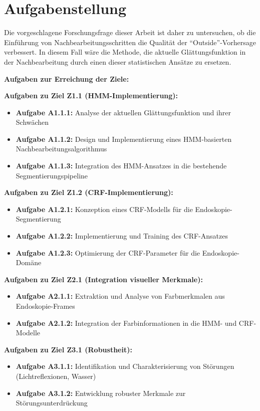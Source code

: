\section{Aufgabenstellung}

Die vorgeschlagene Forschungsfrage dieser Arbeit ist daher zu untersuchen, ob die Einführung von Nachbearbeitungsschritten die Qualität der \enquote{Outside}-Vorhersage verbessert. In diesem Fall wäre die Methode, die aktuelle Glättungsfunktion in der Nachbearbeitung durch einen dieser statistischen Ansätze zu ersetzen.

\textbf{Aufgaben zur Erreichung der Ziele:}

\textbf{Aufgaben zu Ziel Z1.1 (HMM-Implementierung):}
\begin{itemize}
\item \textbf{Aufgabe A1.1.1:} Analyse der aktuellen Glättungsfunktion und ihrer Schwächen
\item \textbf{Aufgabe A1.1.2:} Design und Implementierung eines HMM-basierten Nachbearbeitungsalgorithmus
\item \textbf{Aufgabe A1.1.3:} Integration des HMM-Ansatzes in die bestehende Segmentierungspipeline
\end{itemize}

\textbf{Aufgaben zu Ziel Z1.2 (CRF-Implementierung):}
\begin{itemize}
\item \textbf{Aufgabe A1.2.1:} Konzeption eines CRF-Modells für die Endoskopie-Segmentierung
\item \textbf{Aufgabe A1.2.2:} Implementierung und Training des CRF-Ansatzes
\item \textbf{Aufgabe A1.2.3:} Optimierung der CRF-Parameter für die Endoskopie-Domäne
\end{itemize}

\textbf{Aufgaben zu Ziel Z2.1 (Integration visueller Merkmale):}
\begin{itemize}
\item \textbf{Aufgabe A2.1.1:} Extraktion und Analyse von Farbmerkmalen aus Endoskopie-Frames
\item \textbf{Aufgabe A2.1.2:} Integration der Farbinformationen in die HMM- und CRF-Modelle
\end{itemize}

\textbf{Aufgaben zu Ziel Z3.1 (Robustheit):}
\begin{itemize}
\item \textbf{Aufgabe A3.1.1:} Identifikation und Charakterisierung von Störungen (Lichtreflexionen, Wasser)
\item \textbf{Aufgabe A3.1.2:} Entwicklung robuster Merkmale zur Störungsunterdrückung
\end{itemize}

